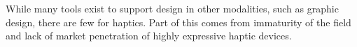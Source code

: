 %
%
%
%
%
%
%
%
%
%
%
%
%
While many tools exist to support design in other modalities, such as graphic design, there are few for haptics.
Part of this comes from immaturity of the field and lack of market penetration of highly expressive haptic devices.
